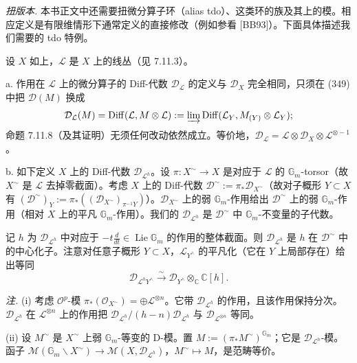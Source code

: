 \emph{扭版本.} 本书正文中还需要扭微分算子环（alias tdo）、这类环的族及其上的模。相应定义是有限维情形下通常定义的直接修改（例如参看 [BB93]）。下面具体描述我们需要的 tdo 特例。

设 $X$ 如上，$\mathcal{L}$ 是 $X$ 上的线丛（见 7.11.3）。

a. 作用在 $\mathcal{L}$ 上的微分算子的 Diff-代数 $\mathcal{D}_{\mathcal{L}}$ 的定义与 $\mathcal{D}_X$ 完全相同，只须在 (349) 中把 $\mathcal{D}(M)$ 换成
\[
\mathcal{D}_{\mathcal{L}}(M)=\operatorname{Diff}(\mathcal{L},M\otimes\mathcal{L}):=\varinjlim\operatorname{Diff}(\mathcal{L}_Y,M_{(Y)}\otimes\mathcal{L}_Y);
\]
命题 7.11.8（及其证明）无须任何改动依然成立。等价地，$\mathcal{D}_{\mathcal{L}}=\mathcal{L}\otimes\mathcal{D}_X\otimes\mathcal{L}^{\otimes-1}$。

b. 如下定义 $X$ 上的 Diff-代数 $\mathcal{D}_{\mathcal{L}^h}$。设 $\pi:X^\sim\to X$ 是对应于 $\mathcal{L}$ 的 $\mathbb{G}_m$-torsor（故 $X^\sim$ 是 $\mathcal{L}$ 去掉零截面）。考虑 $X$ 上的 Diff-代数 $\mathcal{D}^\sim:=\pi_*\mathcal{D}_{X^\sim}$（故对子概形 $Y\subset X$ 有 $(\mathcal{D}^\sim)_Y:=\pi_*((\mathcal{D}_{X^\sim})_{\pi^{-1}Y})$）。$\mathcal{D}_{X^\sim}$ 上的弱 $\mathbb{G}_m$-作用给出 $\mathcal{D}^\sim$ 上的弱 $\mathbb{G}_m$-作用（相对 $X$ 上的平凡 $\mathbb{G}_m$-作用）。我们的 $\mathcal{D}_{\mathcal{L}^h}$ 是 $\mathcal{D}^\sim$ 中 $\mathbb{G}_m$-不变量的子代数。

记 $h$ 为 $\mathcal{D}_{\mathcal{L}^h}$ 中对应于 $-t\frac{d}{dt}\in\operatorname{Lie}\mathbb{G}_m$ 的作用的整体截面。则 $\mathcal{D}_{\mathcal{L}^h}$ 是 $h$ 在 $\mathcal{D}^\sim$ 中的中心化子。注意对任意子概形 $Y\subset X$，$\mathcal{L}_{Y^\wedge}$ 的平凡化（它在 $Y$ 上局部存在）给出等同
\[
\mathcal{D}_{\mathcal{L}^hY^\wedge}\xrightarrow{\sim}\mathcal{D}_{Y^\wedge}\otimes_{\mathbb{C}}\mathbb{C}[h].
\]

\emph{注.} (i) 考虑 $\mathcal{O}^p$-模 $\pi_*(\mathcal{O}_{X^\sim})=\oplus\mathcal{L}^{\otimes n}$。它带 $\mathcal{D}_{\mathcal{L}^h}$ 的作用，且该作用保持分次。$\mathcal{D}_{\mathcal{L}^h}$ 在 $\mathcal{L}^{\otimes n}$ 上的作用把 $\mathcal{D}_{\mathcal{L}^h}/(h-n)\mathcal{D}_{\mathcal{L}^h}$ 与 $\mathcal{D}_{\mathcal{L}^{\otimes n}}$ 等同。


(ii) 设 $M^\sim$ 是 $X^\sim$ 上弱 $\mathbb{G}_m$-等变的 D-模。置 $M:=(\pi_*M^\sim)^{\mathbb{G}_m}$；它是 $\mathcal{D}_{\mathcal{L}^h}$-模。函子 $\mathcal{M}(\mathbb{G}_m\backslash X^\sim)\to\mathcal{M}(X,\mathcal{D}_{\mathcal{L}^h})$，$M^\sim\mapsto M$，是范畴等价。

